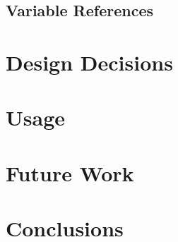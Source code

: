 \subsection{Variable References}


\section{Design Decisions}



\section{Usage}

\section{Future Work}

\section{Conclusions}
